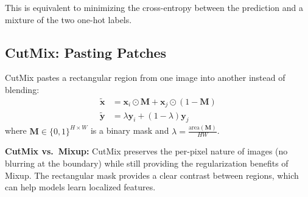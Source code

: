 This is equivalent to minimizing the cross-entropy between the prediction and a mixture of the two one-hot labels.

\subsection{CutMix: Pasting Patches}

CutMix \cite{yun2019cutmix} pastes a rectangular region from one image into another instead of blending:
\begin{align}
\tilde{\mathbf{x}} &= \mathbf{x}_i \odot \mathbf{M} + \mathbf{x}_j \odot (1 - \mathbf{M}) \\
\tilde{\mathbf{y}} &= \lambda \mathbf{y}_i + (1 - \lambda)\mathbf{y}_j
\end{align}
where $\mathbf{M} \in \{0,1\}^{H \times W}$ is a binary mask and $\lambda = \frac{\text{area}(\mathbf{M})}{HW}$.

\textbf{CutMix vs.\ Mixup:} CutMix preserves the per-pixel nature of images (no blurring at the boundary) while still providing the regularization benefits of Mixup. The rectangular mask provides a clear contrast between regions, which can help models learn localized features.


